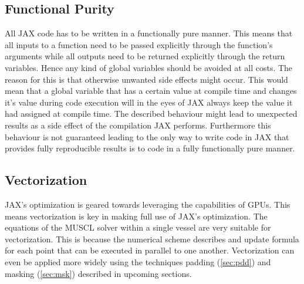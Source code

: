\documentclass[a4paper, oneside]{discothesis}
\begin{document}
							\subsection{Functional Purity}
							All JAX code has to be written in a functionally pure manner.
							This means that all inputs to a function need to be passed explicitly through the function's arguments while all outputs need to be returned explicitly through the return variables.
							Hence any kind of global variables should be avoided at all costs.
							The reason for this is that otherwise unwanted side effects might occur.
							This would mean that a global variable that has a certain value at compile time and changes it's value during code execution will in the eyes of JAX always keep the value it had assigned at compile time.
							The described behaviour might lead to unexpected results as a side effect of the compilation JAX performs.
							Furthermore this behaviour is not guaranteed leading to the only way to write code in JAX that provides fully reproducible results is to code in a fully functionally pure manner.

							\subsection{Vectorization} \label{sec:vect}
							JAX's optimization is geared towards leveraging the capabilities of GPUs.
							This means vectorization is key in making full use of JAX's optimization.
							The equations of the MUSCL solver within a single vessel are very suitable for vectorization.
							This is because the numerical scheme describes and update formula for each point that can be executed in parallel to one another.
							Vectorization can even be applied more widely using the techniques padding (\autoref{sec:pdd}) and masking (\autoref{sec:msk}) described in upcoming sections.
\end{document}
